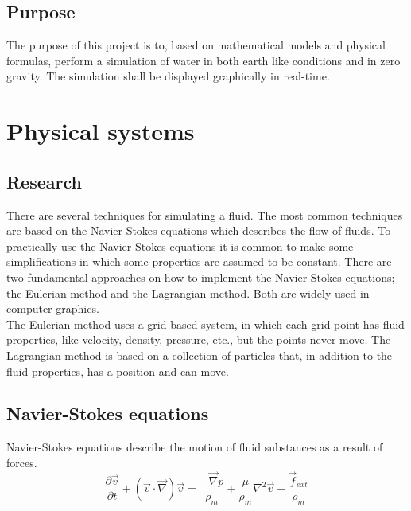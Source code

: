 \documentclass[a4paper,12pt,twoside,final]{report}
\begin{document}
\section{Purpose}
The purpose of this project is to, based on mathematical models and physical formulas, perform a simulation of water in both earth like conditions and in zero gravity. The simulation shall be displayed graphically in real-time.


\chapter{Physical systems}

\section{Research}
There are several techniques for simulating a fluid. The most common techniques are based on the Navier-Stokes equations which describes the flow of fluids. To practically use the Navier-Stokes equations it is common to make some simplifications in which some properties are assumed to be constant. There are two fundamental approaches on how to implement the Navier-Stokes equations; the Eulerian method and the Lagrangian method. Both are widely used in computer graphics. \\

\noindent The Eulerian method uses a grid-based system, in which each grid point has fluid properties, like velocity, density, pressure, etc., but the points never move.
The Lagrangian method is based on a collection of particles that, in addition to the fluid properties, has a position and can move.


\section{Navier-Stokes equations}

Navier-Stokes equations describe the motion of fluid substances as a result of forces. \\

\begin{equation}
\frac{\partial \overrightarrow v}{\partial t} + ({\overrightarrow v}\cdot{\overrightarrow \nabla}){\overrightarrow v} = \frac{-\overrightarrow \nabla p}{\rho_m} + \frac{\mu}{\rho_m}{ \nabla^2}{\overrightarrow v} + \frac{\overrightarrow f_{ext}}{\rho_m}
\label{e1}
\end{equation}
\end{document}
